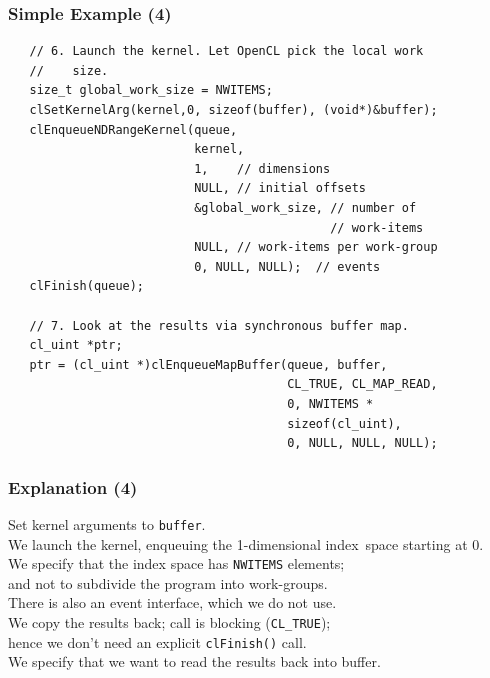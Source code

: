 \begin{frame}[fragile]
  \frametitle{Simple Example (4)}



  \begin{lstlisting}
   // 6. Launch the kernel. Let OpenCL pick the local work
   //    size.
   size_t global_work_size = NWITEMS;
   clSetKernelArg(kernel,0, sizeof(buffer), (void*)&buffer);
   clEnqueueNDRangeKernel(queue,
                          kernel,
                          1,    // dimensions
                          NULL, // initial offsets
                          &global_work_size, // number of
                                             // work-items
                          NULL, // work-items per work-group
                          0, NULL, NULL);  // events
   clFinish(queue);

   // 7. Look at the results via synchronous buffer map.
   cl_uint *ptr;
   ptr = (cl_uint *)clEnqueueMapBuffer(queue, buffer,
                                       CL_TRUE, CL_MAP_READ,
                                       0, NWITEMS *
                                       sizeof(cl_uint),
                                       0, NULL, NULL, NULL);
  \end{lstlisting}

\end{frame}

\begin{frame}
  \frametitle{Explanation (4)}


    Set kernel arguments to {\tt buffer}.\\[.5em]
    We launch the kernel, enqueuing the 1-dimensional index~space starting
      at 0.\\[.5em]
    We specify that the index space has {\tt NWITEMS} elements; \\and not to
      subdivide the program into work-groups.\\[.5em]
    There is also an event interface, which we do not use.\\[2em]

    We copy the results back; call is blocking ({\tt CL\_TRUE});\\
    \qquad hence we don't need an explicit {\tt clFinish()} call.\\[.5em]
    We specify that we want to read the results back into buffer.

\end{frame}

